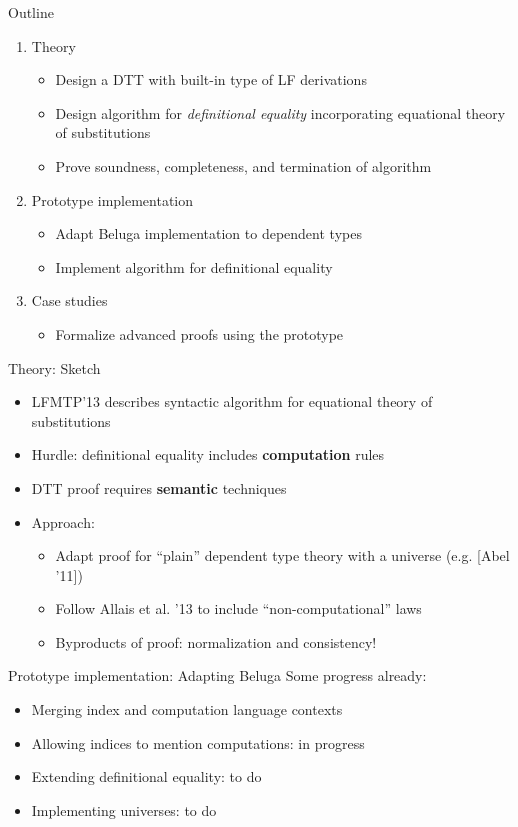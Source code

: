 \documentclass[usenames,dvipsnames]{beamer}
\begin{document}
\begin{frame}{Outline}
\begin{enumerate}
\item Theory
\begin{itemize}
\item Design a DTT with built-in type of LF derivations
\item Design algorithm for \emph{definitional equality} incorporating equational theory of substitutions
\item Prove soundness, completeness, and termination of algorithm
\end{itemize}
\item Prototype implementation
\begin{itemize}
\item Adapt Beluga implementation to dependent types
\item Implement algorithm for definitional equality
\end{itemize}
\item Case studies
\begin{itemize}
\item Formalize advanced proofs using the prototype
\end{itemize}
\end{enumerate}
\end{frame}

\begin{frame}{Theory: Sketch}
\begin{itemize}
\item LFMTP'13 describes syntactic algorithm for equational theory of substitutions
\item Hurdle: definitional equality includes \textbf{computation} rules
\item DTT proof requires \textbf{semantic} techniques
\item Approach:
\begin{itemize}
\item Adapt proof for ``plain'' dependent type theory with a universe (e.g. [Abel '11])
\item Follow Allais et al. '13 to include ``non-computational'' laws
\item Byproducts of proof: normalization and consistency!
\end{itemize}
\end{itemize}
\end{frame}

\begin{frame}{Prototype implementation: Adapting Beluga}
Some progress already:
\begin{itemize}
\item Merging index and computation language contexts \good
\item Allowing indices to mention computations: in progress
\item Extending definitional equality: to do
\item Implementing universes: to do
\end{itemize}
\end{frame}
\end{document}
